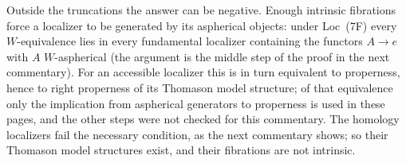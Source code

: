 Outside the truncations the answer can be negative. Enough intrinsic fibrations force a localizer to be generated by its aspherical objects: under Loc~(7F) every $W$-equivalence lies in every fundamental localizer containing the functors $A\to e$ with $A$ $W$-aspherical (the argument is the middle step of the proof in the next commentary). For an accessible localizer this is in turn equivalent to properness, hence to right properness of its Thomason model structure; of that equivalence only the implication from aspherical generators to properness \citep[Corollaire~4.3.28]{Cisinski2006} is used in these pages, and the other steps were not checked for this commentary. The homology localizers fail the necessary condition, as the next commentary shows; so their Thomason model structures exist, and their fibrations are not intrinsic.

